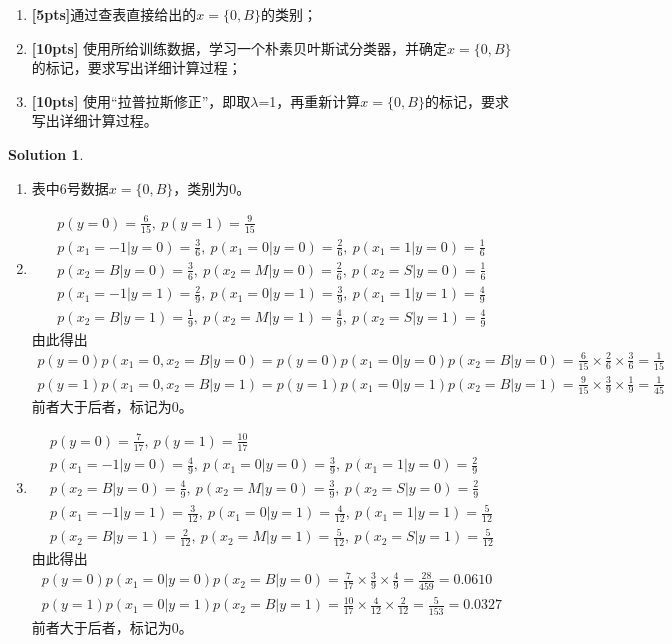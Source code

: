 \documentclass[a4paper,UTF8]{article}
\theoremstyle{definition}
\newtheorem*{solution}{Solution}
\begin{document}
	\begin{enumerate}[(1)]
	    \item \textbf{[5pts]}通过查表直接给出的$x=\{0,B\}$的类别；
		\item \textbf{[10pts]} 使用所给训练数据，学习一个朴素贝叶斯试分类器，并确定$x=\{0,B\}$的标记，要求写出详细计算过程；
		\item \textbf{[10pts]} 使用“拉普拉斯修正”，即取$\lambda$=1，再重新计算$x=\{0,B\}$的标记，要求写出详细计算过程。
	\end{enumerate}
	
\begin{solution}
	~\\
	\begin{enumerate}[(1)]
		\item 
		表中6号数据$x=\{0,B\}$，类别为0。
		\item 
		\begin{gather*}
		p(y=0)=\frac{6}{15},\ p(y=1)=\frac{9}{15}\\
		p(x_1=-1|y=0)=\frac{3}{6},\ p(x_1=0|y=0)=\frac{2}{6},\ p(x_1=1|y=0)=\frac{1}{6}\\
		p(x_2=B|y=0)=\frac{3}{6},\ p(x_2=M|y=0)=\frac{2}{6},\ p(x_2=S|y=0)=\frac{1}{6}\\
		p(x_1=-1|y=1)=\frac{2}{9},\ p(x_1=0|y=1)=\frac{3}{9},\ p(x_1=1|y=1)=\frac{4}{9}\\
		p(x_2=B|y=1)=\frac{1}{9},\ p(x_2=M|y=1)=\frac{4}{9},\ p(x_2=S|y=1)=\frac{4}{9}
		\end{gather*}
		由此得出
		\begin{gather*}
		p(y=0)p(x_1=0,x_2=B|y=0)=p(y=0)p(x_1=0|y=0)p(x_2=B|y=0)=\frac{6}{15}\times\frac{2}{6}\times\frac{3}{6}=\frac{1}{15}\\
		p(y=1)p(x_1=0,x_2=B|y=1)=p(y=1)p(x_1=0|y=1)p(x_2=B|y=1)=\frac{9}{15}\times\frac{3}{9}\times\frac{1}{9}=\frac{1}{45}
		\end{gather*}
		前者大于后者，标记为0。
		\item 
		\begin{gather*}
		p(y=0)=\frac{7}{17},\ p(y=1)=\frac{10}{17}\\
		p(x_1=-1|y=0)=\frac{4}{9},\ p(x_1=0|y=0)=\frac{3}{9},\ p(x_1=1|y=0)=\frac{2}{9}\\
		p(x_2=B|y=0)=\frac{4}{9},\ p(x_2=M|y=0)=\frac{3}{9},\ p(x_2=S|y=0)=\frac{2}{9}\\
		p(x_1=-1|y=1)=\frac{3}{12},\ p(x_1=0|y=1)=\frac{4}{12},\ p(x_1=1|y=1)=\frac{5}{12}\\
		p(x_2=B|y=1)=\frac{2}{12},\ p(x_2=M|y=1)=\frac{5}{12},\ p(x_2=S|y=1)=\frac{5}{12}
		\end{gather*}
		由此得出
		\begin{gather*}
		p(y=0)p(x_1=0|y=0)p(x_2=B|y=0)=\frac{7}{17}\times\frac{3}{9}\times\frac{4}{9}=\frac{28}{459}=0.0610\\
		p(y=1)p(x_1=0|y=1)p(x_2=B|y=1)=\frac{10}{17}\times\frac{4}{12}\times\frac{2}{12}=\frac{5}{153}=0.0327
		\end{gather*}
		前者大于后者，标记为0。
	\end{enumerate}
\end{solution}
\end{document}
